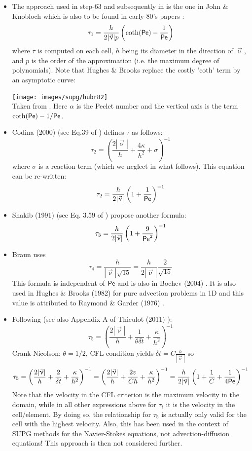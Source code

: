 \begin{itemize}
\item The approach used in step-63 and subsequently in \aspect{} is the 
one in John \& Knobloch \cite{jokn06,knob08} which is also to be found in early 
80's papers \cite{brhu82,hubr82}:
\[
\tau_1 = \frac{h}{2 |\vec\upnu| p} \left( \coth ({\mathsf{Pe}}) - \frac{1}{{\mathsf{Pe}}} \right)
\]
where $\tau$ is computed on each cell, $h$ being its diameter in the direction of $\vec\upnu$, 
and $p$ is the order of the approximation (i.e. the maximum degree of polynomials).
Note that Hughes \& Brooks \cite{hubr82} replace the costly 'coth' term by an asymptotic curve:

\begin{center}
\texttt{[image: images/supg/hubr82]}\\
{\captionfont Taken from \cite{hubr82}. Here $\alpha$ is the Peclet number and the vertical axis
is the term $ \coth ({\mathsf{Pe}}) -1/{\mathsf{Pe}}$.}
\end{center}


\item
Codina (2000) (see Eq.39 of \cite{codi00}) defines $\tau$ as follows:
\[
\tau_2= \left( \frac{2 |\vec\upnu|}{h} + \frac{4 \kappa}{h^2} + \sigma   \right)^{-1}
\]
where $\sigma$ is a reaction term (which we neglect in what follows). This equation 
can be re-written:
\[
\tau_2= \frac{h}{2 |\vec\upnu|} \left( 1 + \frac{1}{{\mathsf{Pe}}} \right)^{-1}
\]

\item
Shakib \etal (1991) (see Eq. 3.59 of \cite{shhj91}) propose another formula:
\[
\tau_3= \frac{h}{2 |\vec\upnu|} \left( 1 + \frac{9}{{\mathsf{Pe}}^2} \right)^{-1}
\]

\item
Braun \cite{brau03} uses 
\[
\tau_4 = \frac{h}{|\vec\upnu| \sqrt{15}} = \frac{h}{2|\vec\upnu|} \frac{2}{\sqrt{15}} 
\]
This formula is independent of ${\mathsf{Pe}}$ and is also in Bochev \etal (2004) \cite{bogs04}.
It is also used in Hughes \& Brooks (1982) \cite{hubr82} for pure advection problems in 1D
and this value is attributed to Raymond \& Garder (1976)  \cite{raga76}.

\item Following \cite{teos00} (see also Appendix A of Thieulot (2011) \cite{thie11}):
\[
\tau_5 = \left( \frac{2 |\vec{\upnu}|}{h} + \frac{1}{\theta \delta t} + \frac{\kappa}{h^2} \right)^{-1}  
\]
Crank-Nicolson: $\theta=1/2$, CFL condition yields $\delta t = C \frac{h}{|\vec\upnu|}$ so 
\[
\tau_5 = \left( \frac{2 |\vec{\upnu}|}{h} + \frac{2}{\delta t}+  \frac{\kappa}{h^2}  \right)^{-1}  
= \left( \frac{2 |\vec{\upnu}|}{h} + \frac{2 v}{C h} +  \frac{\kappa}{h^2}  \right)^{-1}  
= \frac{h}{2 |\vec{\upnu}|}  \left( 1 + \frac{1}{C} + \frac{1}{4 {\mathsf{Pe}}} \right)^{-1} \nonumber 
\]
Note that the velocity in the CFL criterion is the maximum velocity in the domain, while 
in all other expressions above for $\tau_i$ it is the velocity in the cell/element. 
By doing so, the relationship  for $\tau_5$ is actually only valid for the cell with the 
highest velocity. 
Also, this has been used in the context of SUPG methods for the Navier-Stokes equations, 
not advection-diffusion equations! This approach is then not considered further.


\end{itemize}
